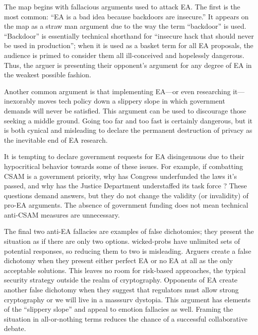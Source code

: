 \documentclass{IEEEtran}
\begin{document}
The map begins with fallacious arguments used to attack \ac{EA}. The first is the most common: ``\ac{EA} is a bad idea
because backdoors are insecure.'' It appears on the map as a straw man argument due to the way the term ``backdoor'' is
used. ``Backdoor'' is essentially technical shorthand for ``insecure hack that should never be used in production'';
when it is used as a basket term for all \ac{EA} proposals, the audience is primed to consider them all ill-conceived
and hopelessly dangerous. Thus, the arguer is presenting their opponent's argument for any degree of \ac{EA} in the
weakest possible fashion.

Another common argument is that implementing \ac{EA}---or even researching it---inexorably moves tech policy down a
slippery slope in which government demands will never be satisfied. This argument can be used to discourage those
seeking a middle ground. Going too far and too fast is certainly dangerous, but it is both cynical and misleading to
declare the permanent destruction of privacy as the inevitable end of \ac{EA} research.

It is tempting to declare government requests for \ac{EA} disingenuous due to their hypocritical behavior towards some
of these issues. For example, if combatting \ac{CSAM} is a government priority, why has Congress underfunded the laws
it's passed, and why has the Justice Department understaffed its task force \cite{keller_internet_2019}? These questions
demand answers, but they do not change the validity (or invalidity) of pro-\ac{EA} arguments. The absence of government
funding does not mean technical anti-\ac{CSAM} measures are unnecessary.

The final two anti-\ac{EA} fallacies are examples of false dichotomies; they present the situation as if there are only
two options. \Acp{wicked-prob} have unlimited sets of potential responses, so reducing them to two is misleading.
Arguers create a false dichotomy when they present either perfect \ac{EA} or no \ac{EA} at all as the only acceptable
solutions. This leaves no room for risk-based approaches, the typical security strategy outside the realm of
cryptography. Opponents of \ac{EA} create another false dichotomy when they suggest that regulators must allow strong
cryptography or we will live in a \ac{masssurv} dystopia. This argument has elements of the ``slippery slope'' and
appeal to emotion fallacies as well. Framing the situation in all-or-nothing terms reduces the chance of a successful
collaborative debate.
\end{document}
